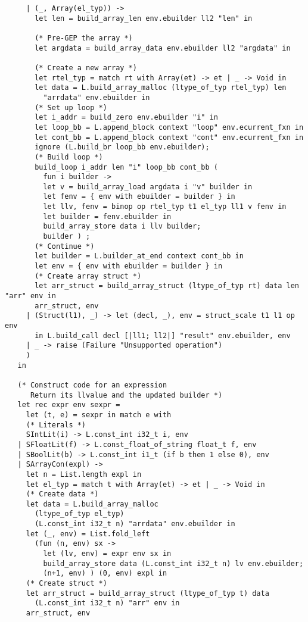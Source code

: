 \documentclass[main.tex]{subfiles}
\begin{document}
\begin{lstlisting}
     | (_, Array(el_typ)) -> 
       let len = build_array_len env.ebuilder ll2 "len" in
      
       (* Pre-GEP the array *)
       let argdata = build_array_data env.ebuilder ll2 "argdata" in
     
       (* Create a new array *)
       let rtel_typ = match rt with Array(et) -> et | _ -> Void in
       let data = L.build_array_malloc (ltype_of_typ rtel_typ) len
         "arrdata" env.ebuilder in
       (* Set up loop *)
       let i_addr = build_zero env.ebuilder "i" in
       let loop_bb = L.append_block context "loop" env.ecurrent_fxn in
       let cont_bb = L.append_block context "cont" env.ecurrent_fxn in
       ignore (L.build_br loop_bb env.ebuilder);
       (* Build loop *)
       build_loop i_addr len "i" loop_bb cont_bb (
         fun i builder -> 
         let v = build_array_load argdata i "v" builder in
         let fenv = { env with ebuilder = builder } in
         let llv, fenv = binop op rtel_typ t1 el_typ ll1 v fenv in
         let builder = fenv.ebuilder in
         build_array_store data i llv builder;
         builder ) ;
       (* Continue *)
       let builder = L.builder_at_end context cont_bb in
       let env = { env with ebuilder = builder } in
       (* Create array struct *)
       let arr_struct = build_array_struct (ltype_of_typ rt) data len "arr" env in
       arr_struct, env
     | (Struct(l1), _) -> let (decl, _), env = struct_scale t1 l1 op env 
       in L.build_call decl [|ll1; ll2|] "result" env.ebuilder, env
     | _ -> raise (Failure "Unsupported operation")
     )
   in

   (* Construct code for an expression
      Return its llvalue and the updated builder *)
   let rec expr env sexpr = 
     let (t, e) = sexpr in match e with
     (* Literals *)
     SIntLit(i) -> L.const_int i32_t i, env
   | SFloatLit(f) -> L.const_float_of_string float_t f, env
   | SBoolLit(b) -> L.const_int i1_t (if b then 1 else 0), env
   | SArrayCon(expl) -> 
     let n = List.length expl in
     let el_typ = match t with Array(et) -> et | _ -> Void in
     (* Create data *)
     let data = L.build_array_malloc
       (ltype_of_typ el_typ)
       (L.const_int i32_t n) "arrdata" env.ebuilder in 
     let (_, env) = List.fold_left
       (fun (n, env) sx -> 
         let (lv, env) = expr env sx in
         build_array_store data (L.const_int i32_t n) lv env.ebuilder;
         (n+1, env) ) (0, env) expl in
     (* Create struct *)
     let arr_struct = build_array_struct (ltype_of_typ t) data
       (L.const_int i32_t n) "arr" env in
     arr_struct, env


\end{lstlisting}
\end{document}
